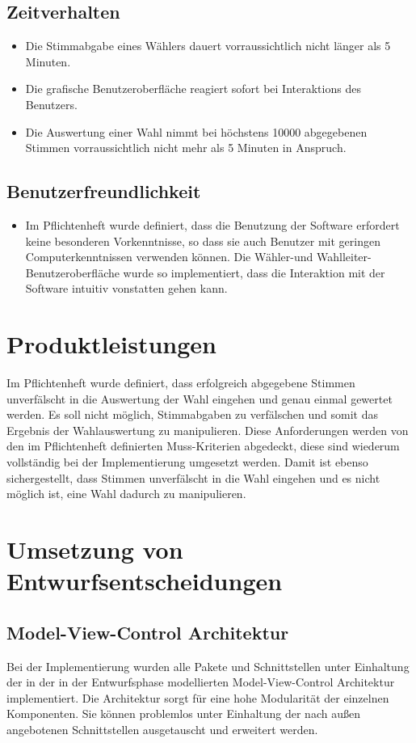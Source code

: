 \documentclass[parskip=full]{scrartcl}
\begin{document}
\subsection{Zeitverhalten}

\begin{itemize}
	\item Die Stimmabgabe eines Wählers dauert vorraussichtlich nicht länger als 5 Minuten.
	\item Die grafische Benutzeroberfläche reagiert sofort bei Interaktions des Benutzers.
	\item Die Auswertung einer Wahl nimmt bei höchstens 10000 abgegebenen Stimmen vorraussichtlich nicht mehr als 5 Minuten in Anspruch.
\end{itemize}

\subsection{Benutzerfreundlichkeit}
\begin{itemize}
	\item Im Pflichtenheft wurde definiert, dass die Benutzung der Software erfordert keine besonderen Vorkenntnisse, so dass sie auch Benutzer mit geringen Computerkenntnissen verwenden können. Die Wähler-und Wahlleiter-Benutzeroberfläche wurde so implementiert, dass die Interaktion mit der Software intuitiv vonstatten gehen kann.
\end{itemize}

\section{Produktleistungen}

Im Pflichtenheft wurde definiert, dass erfolgreich abgegebene Stimmen unverfälscht in die Auswertung der Wahl eingehen und genau einmal gewertet werden. Es soll nicht möglich, Stimmabgaben zu verfälschen und somit das Ergebnis der Wahlauswertung zu manipulieren.
Diese Anforderungen werden von den im Pflichtenheft definierten Muss-Kriterien abgedeckt, diese sind wiederum vollständig bei der Implementierung umgesetzt werden. Damit ist ebenso sichergestellt, dass Stimmen unverfälscht in die Wahl eingehen und es nicht möglich ist, eine Wahl dadurch zu manipulieren.

		
\section{Umsetzung von Entwurfsentscheidungen}
\subsection{Model-View-Control Architektur}
Bei der Implementierung wurden alle Pakete und Schnittstellen unter Einhaltung der in der in der Entwurfsphase modellierten Model-View-Control Architektur implementiert. Die Architektur sorgt für eine hohe Modularität der einzelnen Komponenten. Sie können problemlos unter Einhaltung der nach außen angebotenen Schnittstellen ausgetauscht und erweitert werden. 
\end{document}
